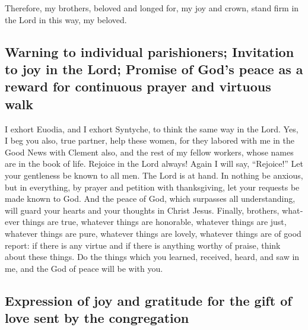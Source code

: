 \begin{paracol}{2}
\begin{otherlanguage}{english}
 Therefore, my brothers, beloved and longed for, my joy
and crown, stand firm in the Lord in this way, my beloved.

\hypertarget{warning-to-individual-parishioners-invitation-to-joy-in-the-lord-promise-of-gods-peace-as-a-reward-for-continuous-prayer-and-virtuous-walk}{%
\subsection{Warning to individual parishioners; Invitation to joy in the
Lord; Promise of God's peace as a reward for continuous prayer and
virtuous
walk}\label{warning-to-individual-parishioners-invitation-to-joy-in-the-lord-promise-of-gods-peace-as-a-reward-for-continuous-prayer-and-virtuous-walk}}

 I exhort Euodia, and I exhort Syntyche, to think the same
way in the Lord.  Yes, I beg you also, true partner, help
these women, for they labored with me in the Good News with Clement
also, and the rest of my fellow workers, whose names are in the book of
life.  Rejoice in the Lord always! Again I will say,
``Rejoice!''  Let your gentleness be known to all men. The
Lord is at hand.  In nothing be anxious, but in
everything, by prayer and petition with thanksgiving, let your requests
be made known to God.  And the peace of God, which
surpasses all understanding, will guard your hearts and your thoughts in
Christ Jesus.  Finally, brothers, whatever things are
true, whatever things are honorable, whatever things are just, whatever
things are pure, whatever things are lovely, whatever things are of good
report: if there is any virtue and if there is anything worthy of
praise, think about these things.  Do the things which you
learned, received, heard, and saw in me, and the God of peace will be
with you.

\hypertarget{expression-of-joy-and-gratitude-for-the-gift-of-love-sent-by-the-congregation}{%
\subsection{Expression of joy and gratitude for the gift of love sent by
the
congregation}\label{expression-of-joy-and-gratitude-for-the-gift-of-love-sent-by-the-congregation}}


\end{otherlanguage}
\end{paracol}
